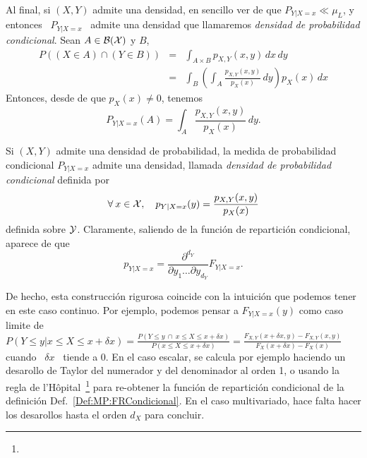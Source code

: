 {Al final, si $(X,Y)$ admite una  densidad, en sencillo ver de que $P_{Y|X=x} \ll
\mu_L$,  y entonces  \ $P_{Y|X=x}$  \ admite  una densidad  que  llamaremos {\it
  densidad de probabilidad condicional}. Sean $A \in \mathcal{B}(\mathcal{X})$ y $B$,
%
\begin{eqnarray*}
P\left( (X \in A) \cap (Y \in B) \right) & = & \int_{A \times B} p_{X,Y}(x,y) \, dx \, dy\\[2mm]
%
& = & \int_B \left( \int_A \frac{p_{X,Y}(x,y)}{p_X(x)} \, dy \right) p_X(x) \, dx
\end{eqnarray*}
%
Entonces, desde de que $p_X(x) \ne 0$, tenemos
%
\[
P_{Y|X=x}(A) = \int_A \frac{p_{X,Y}(x,y)}{p_X(x)} \, dy.
\]
%
\begin{teorema}
  Si  $(X,Y)$ admite  una densidad  de probabilidad,  la medida  de probabilidad
  condicional  $P_{Y|X=x}$  admite  una   densidad,  llamada  {\it  densidad  de
    probabilidad condicional} definida por
  \[
  \forall \: x \in \mathcal{X}, \quad p_{Y|X=x}(y) = \frac{p_{X,Y}(x,y)}{p_X(x)}
  \]
  definida  sobre $\mathcal{Y}$. Claramente,  saliendo de  la funci\'on  de repartici\'on
  condicional, aparece de que
  \[
  p_{Y|X=x} = \frac{\partial^{d_Y}}{\partial y_1 \ldots \partial y_{d_Y}} F_{Y|X=x}.
  \]
\end{teorema}

De hecho, esta  construcci\'on rigurosa coincide con la  intuici\'on que podemos
tener en este  caso continuo. Por ejemplo, podemos  pensar a $F_{Y|X=x}(y)$ como
caso limite de  $P(\left. Y \le y \right|  x \le X \le x+\delta x)  = \frac{P( Y
  \le  y \:  \cap \:  x \le  X \le  x+\delta x)}{P(x  \le X  \le x+\delta  x)} =
\frac{F_{X,Y}(x+\delta  x ,  y) -  F_{X,Y}(x  , y)}{F_X(x+\delta  x) -  F_X(x)}$
cuando \ $\delta  x$ \ tiende a 0.   En el caso escalar, se  calcula por ejemplo
haciendo un  desarollo de Taylor del numerador  y del denominador al  orden 1, o
usando la  regla de l'H\^opital~\footnote{}  para re-obtener la funci\'on
de        repartici\'on       condicional        de        la       definici\'on
Def.~\ref{Def:MP:FRCondicional}. En  el caso multivariado, hace  falta hacer los
desarollos hasta el orden $d_X$ para concluir.

}
